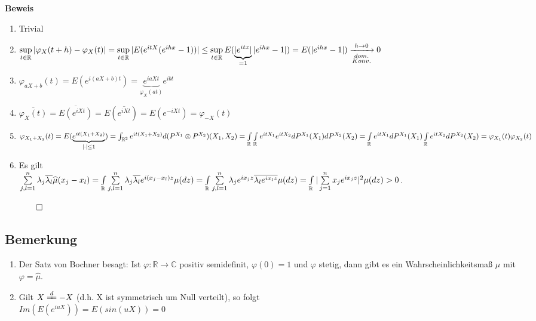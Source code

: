 \documentclass[german,10pt,oneside, fleqn, a4paper]{article}
\newcommand {\R}	{\mathbb{R}}
\newcommand {\C}	{\mathbb{C}}
\newcommand{\ra}{\rightarrow}
\newcommand{\sm}[2][\infty]{\sum\limits_{#2}^{#1}}
\newcommand{\QED}{\begin{flushright}$\qed$\end{flushright}}
\newcommand{\beweis}{\textbf{Beweis}\\}
\newcommand{\1}[1]{1_{#1}}
\newcommand{\2}[1]{\1{\brac{#1}}}
\newcommand{\xr}[2][]{\xrightarrow[#1]{#2}}
\begin{document}
\beweis
\begin{enumerate}[label=(\alph*)]
\item Trivial
\item $\sup\limits_{t\in\R}|\varphi_X(t+h)-\varphi_X(t)|\\
=\sup\limits_{t\in\R}|E(e^{itX}(e^{ihx}-1))|\\
\leq \sup\limits_{t\in\R}E(\underbrace{|e^{itx}|}_{=1}|e^{ihx}-1|)\\
=E(|e^{ihx}-1|)\xr[\substack{dom. \\Konv.}]{h\ra0}0$
\item $\varphi_{aX+b}(t)=E(e^{i(aX+b)t})=\underbrace{e^{iaXt}}_{\varphi_X(at)}e^{ibt}$
\item $\overline{\varphi_X(t)}=\overline{E(e^{iXt})}=E(\overline{e^{iXt}})=E(e^{-iXt})=\varphi_{-X}(t)$
\item $\varphi_{X_1+X_2}(t)=E(\underbrace{e^{it(X_1+X_2)}}_{|\cdot|\leq1})\\
=\int_{\R^2}e^{it(X_1+X_2)}d(P^{X_1}\otimes P^{X_2})(X_1, X_2)\\
=\int\limits_\R\int\limits_\R e^{itX_1}e^{itX_2}dP^{X_1}(X_1)dP^{X_2}(X_2)\\
=\int\limits_\R e^{itX_1}dP^{X_1}(X_1)\int\limits_\R e^{itX_2}dP^{X_2}(X_2)\\
=\varphi_{X_1}(t)\varphi_{X_2}(t)$
\item Es gilt\\
$\sm[n]{j,l=1} \lambda_j\overline{\lambda_l}\widehat{\mu}(x_j-x_l)=\int\limits_\R\sm[n]{j,l=1}\lambda_j\overline{\lambda_l}e^{i(x_j-x_l)z}\mu(dz)\\
=\int\limits_\R\sm[n]{j,l=1}\lambda_je^{ix_jz}\overline{\lambda_le^{ix_lz}}\mu(dz)\\
=\int\limits_\R|\sm[n]{j=1}x_je^{ix_jz}|^2\mu(dz)>0$.\QED
\end{enumerate}

\subsection{Bemerkung}
\label{4.3}
\begin{enumerate}[label=(\alph*)]
\item Der Satz von Bochner besagt: Ist $\varphi:\R\ra\C$ positiv semidefinit, $\varphi(0)=1$ und $\varphi$ stetig, dann gibt es ein Wahrscheinlichkeitsmaß $\mu$ mit $\varphi=\widehat\mu$.
\item Gilt $X\xlongequal{d}-X$ (d.h. X ist symmetrisch um Null verteilt), so folgt\\
$Im(E(e^{iuX}))=E(sin(uX))=0$
\end{enumerate}
\end{document}

